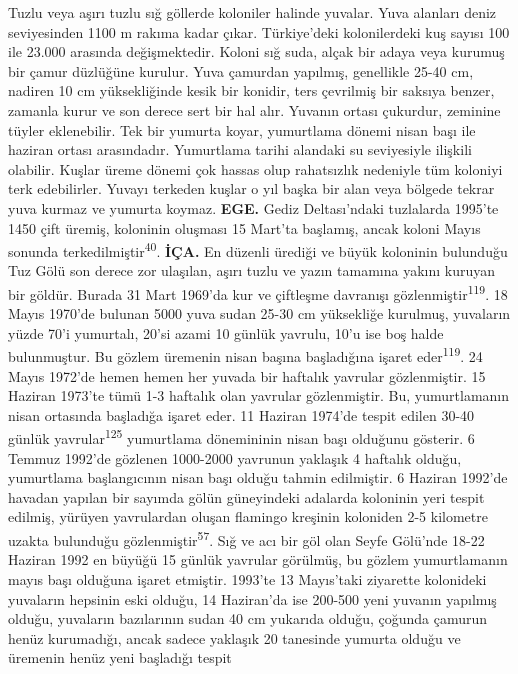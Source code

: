 \documentclass[
  letterpaper,
  DIV=11,
  numbers=noendperiod]{scrreprt}
\begin{document}
Tuzlu veya aşırı tuzlu sığ göllerde koloniler halinde yuvalar. Yuva
alanları deniz seviyesinden 1100 m rakıma kadar çıkar. Türkiye'deki
kolonilerdeki kuş sayısı 100 ile 23.000 arasında değişmektedir. Koloni
sığ suda, alçak bir adaya veya kurumuş bir çamur düzlüğüne kurulur. Yuva
çamurdan yapılmış, genellikle 25-40 cm, nadiren 10 cm yüksekliğinde
kesik bir konidir, ters çevrilmiş bir saksıya benzer, zamanla kurur ve
son derece sert bir hal alır. Yuvanın ortası çukurdur, zeminine tüyler
eklenebilir. Tek bir yumurta koyar, yumurtlama dönemi nisan başı ile
haziran ortası arasındadır. Yumurtlama tarihi alandaki su seviyesiyle
ilişkili olabilir. Kuşlar üreme dönemi çok hassas olup rahatsızlık
nedeniyle tüm koloniyi terk edebilirler. Yuvayı terkeden kuşlar o yıl
başka bir alan veya bölgede tekrar yuva kurmaz ve yumurta koymaz.
\textbf{EGE.} Gediz Deltası'ndaki tuzlalarda 1995'te 1450 çift üremiş,
koloninin oluşması 15 Mart'ta başlamış, ancak koloni Mayıs sonunda
terkedilmiştir\textsuperscript{40}. \textbf{İÇA.} En düzenli ürediği ve
büyük koloninin bulunduğu Tuz Gölü son derece zor ulaşılan, aşırı tuzlu
ve yazın tamamına yakını kuruyan bir göldür. Burada 31 Mart 1969'da kur
ve çiftleşme davranışı gözlenmiştir\textsuperscript{119}. 18 Mayıs
1970'de bulunan 5000 yuva sudan 25-30 cm yüksekliğe kurulmuş, yuvaların
yüzde 70'i yumurtalı, 20'si azami 10 günlük yavrulu, 10'u ise boş halde
bulunmuştur. Bu gözlem üremenin nisan başına başladığına işaret
eder\textsuperscript{119}. 24 Mayıs 1972'de hemen hemen her yuvada bir
haftalık yavrular gözlenmiştir. 15 Haziran 1973'te tümü 1-3 haftalık
olan yavrular gözlenmiştir. Bu, yumurtlamanın nisan ortasında başladığa
işaret eder. 11 Haziran 1974'de tespit edilen 30-40 günlük
yavrular\textsuperscript{125} yumurtlama dönemininin nisan başı olduğunu
gösterir. 6 Temmuz 1992'de gözlenen 1000-2000 yavrunun yaklaşık 4
haftalık olduğu, yumurtlama başlangıcının nisan başı olduğu tahmin
edilmiştir. 6 Haziran 1992'de havadan yapılan bir sayımda gölün
güneyindeki adalarda koloninin yeri tespit edilmiş, yürüyen yavrulardan
oluşan flamingo kreşinin koloniden 2-5 kilometre uzakta bulunduğu
gözlenmiştir\textsuperscript{57}. Sığ ve acı bir göl olan Seyfe Gölü'nde
18-22 Haziran 1992 en büyüğü 15 günlük yavrular görülmüş, bu gözlem
yumurtlamanın mayıs başı olduğuna işaret etmiştir. 1993'te 13 Mayıs'taki
ziyarette kolonideki yuvaların hepsinin eski olduğu, 14 Haziran'da ise
200-500 yeni yuvanın yapılmış olduğu, yuvaların bazılarının sudan 40 cm
yukarıda olduğu, çoğunda çamurun henüz kurumadığı, ancak sadece yaklaşık
20 tanesinde yumurta olduğu ve üremenin henüz yeni başladığı tespit
\end{document}
